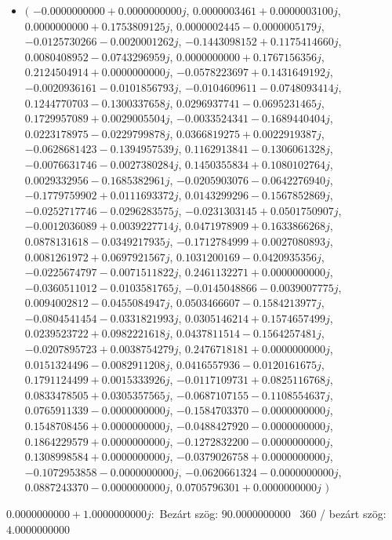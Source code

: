 \documentclass[14pt,a4paper]{article}
\begin{document}
\begin{itemize}
\item
$\big($
$-0.0000000000+0.0000000000j$, $0.0000003461+0.0000003100j$, $0.0000000000+0.1753809125j$, $0.0000002445-0.0000005179j$, $-0.0125730266-0.0020001262j$, $-0.1443098152+0.1175414660j$, $0.0080408952-0.0743296959j$, $0.0000000000+0.1767156356j$, $0.2124504914+0.0000000000j$, $-0.0578223697+0.1431649192j$, $-0.0020936161-0.0101856793j$, $-0.0104609611-0.0748093414j$, $0.1244770703-0.1300337658j$, $0.0296937741-0.0695231465j$, $0.1729957089+0.0029005504j$, $-0.0033524341-0.1689440404j$, $0.0223178975-0.0229799878j$, $0.0366819275+0.0022919387j$, $-0.0628681423-0.1394957539j$, $0.1162913841-0.1306061328j$, $-0.0076631746-0.0027380284j$, $0.1450355834+0.1080102764j$, $0.0029332956-0.1685382961j$, $-0.0205903076-0.0642276940j$, $-0.1779759902+0.0111693372j$, $0.0143299296-0.1567852869j$, $-0.0252717746-0.0296283575j$, $-0.0231303145+0.0501750907j$, $-0.0012036089+0.0039227714j$, $0.0471978909+0.1633866268j$, $0.0878131618-0.0349217935j$, $-0.1712784999+0.0027080893j$, $0.0081261972+0.0697921567j$, $0.1031200169-0.0420935356j$, $-0.0225674797-0.0071511822j$, $0.2461132271+0.0000000000j$, $-0.0360511012-0.0103581765j$, $-0.0145048866-0.0039007775j$, $0.0094002812-0.0455084947j$, $0.0503466607-0.1584213977j$, $-0.0804541454-0.0331821993j$, $0.0305146214+0.1574657499j$, $0.0239523722+0.0982221618j$, $0.0437811514-0.1564257481j$, $-0.0207895723+0.0038754279j$, $0.2476718181+0.0000000000j$, $0.0151324496-0.0082911208j$, $0.0416557936-0.0120161675j$, $0.1791124499+0.0015333926j$, $-0.0117109731+0.0825116768j$, $0.0833478505+0.0305357565j$, $-0.0687107155-0.1108554637j$, $0.0765911339-0.0000000000j$, $-0.1584703370-0.0000000000j$, $0.1548708456+0.0000000000j$, $-0.0488427920-0.0000000000j$, $0.1864229579+0.0000000000j$, $-0.1272832200-0.0000000000j$, $0.1308998584+0.0000000000j$, $-0.0379026758+0.0000000000j$, $-0.1072953858-0.0000000000j$, $-0.0620661324-0.0000000000j$, $0.0887243370-0.0000000000j$, $0.0705796301+0.0000000000j$
$\big)$
\end{itemize}
$0.0000000000+1.0000000000j$:\
Bezárt szög: $90.0000000000$ \
360 / bezárt szög: $4.0000000000$\
\end{document}
